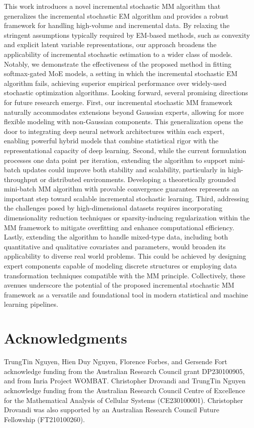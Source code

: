 \documentclass{article}
\begin{document}
This work introduces a novel incremental stochastic MM algorithm that generalizes the incremental stochastic EM algorithm and provides a robust framework for handling high-volume and incremental data. By relaxing the stringent assumptions typically required by EM-based methods, such as convexity and explicit latent variable representations, our approach broadens the applicability of incremental stochastic estimation to a wider class of models. Notably, we demonstrate the effectiveness of the proposed method in fitting softmax-gated MoE models, a setting in which the incremental stochastic EM algorithm fails, achieving superior empirical performance over widely-used stochastic optimization algorithms. Looking forward, several promising directions for future research emerge. First, our incremental stochastic MM framework naturally accommodates extensions beyond Gaussian experts, allowing for more flexible modeling with non-Gaussian components. This generalization opens the door to integrating deep neural network architectures within each expert, enabling powerful hybrid models that combine statistical rigor with the representational capacity of deep learning. Second, while the current formulation processes one data point per iteration, extending the algorithm to support mini-batch updates could improve both stability and scalability, particularly in high-throughput or distributed environments. Developing a theoretically grounded mini-batch MM algorithm with provable convergence guarantees represents an important step toward scalable incremental stochastic learning. Third, addressing the challenges posed by high-dimensional datasets requires incorporating dimensionality reduction techniques or sparsity-inducing regularization within the MM framework to mitigate overfitting and enhance computational efficiency. Lastly, extending the algorithm to handle mixed-type data, including both quantitative and qualitative covariates and parameters, would broaden its applicability to diverse real world problems. This could be achieved by designing expert components capable of modeling discrete structures or employing data transformation techniques compatible with the MM principle. Collectively, these avenues underscore the potential of the proposed incremental stochastic MM framework as a versatile and foundational tool in modern statistical and machine learning pipelines.

\section*{Acknowledgments} TrungTin Nguyen, Hien Duy Nguyen, Florence Forbes, and Gersende Fort acknowledge funding from the Australian Research Council grant DP230100905, and from Inria Project WOMBAT. Christopher Drovandi and TrungTin Nguyen acknowledge funding from the Australian Research Council Centre of Excellence for the Mathematical Analysis of Cellular Systems (CE230100001). Christopher Drovandi was also supported by an Australian Research Council Future Fellowship
(FT210100260).
\end{document}
